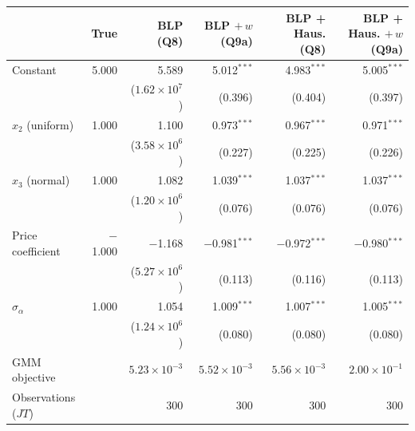 \begin{tabular}{lrrrrr}
\toprule
 & True & BLP (Q8) & BLP $+\,w$ (Q9a) & BLP + Haus. (Q8) & BLP + Haus. $+\,w$ (Q9a) \\
\midrule
Constant & 5.000 & 5.589 & 5.012$^{***}$ & 4.983$^{***}$ & 5.005$^{***}$ \\
 &  & ($1.62\times10^{7}$) & (0.396) & (0.404) & (0.397) \\
$x_2$ (uniform) & 1.000 & 1.100 & 0.973$^{***}$ & 0.967$^{***}$ & 0.971$^{***}$ \\
 &  & ($3.58\times10^{6}$) & (0.227) & (0.225) & (0.226) \\
$x_3$ (normal) & 1.000 & 1.082 & 1.039$^{***}$ & 1.037$^{***}$ & 1.037$^{***}$ \\
 &  & ($1.20\times10^{6}$) & (0.076) & (0.076) & (0.076) \\
Price coefficient & $-$1.000 & $-$1.168 & $-$0.981$^{***}$ & $-$0.972$^{***}$ & $-$0.980$^{***}$ \\
 &  & ($5.27\times10^{6}$) & (0.113) & (0.116) & (0.113) \\
$\sigma_\alpha$ & 1.000 & 1.054 & 1.009$^{***}$ & 1.007$^{***}$ & 1.005$^{***}$ \\
 &  & ($1.24\times10^{6}$) & (0.080) & (0.080) & (0.080) \\
\midrule
GMM objective &  & $5.23\times10^{-3}$ & $5.52\times10^{-3}$ & $5.56\times10^{-3}$ & $2.00\times10^{-1}$ \\
Observations ($JT$) &  & 300 & 300 & 300 & 300 \\
\bottomrule
\end{tabular}
